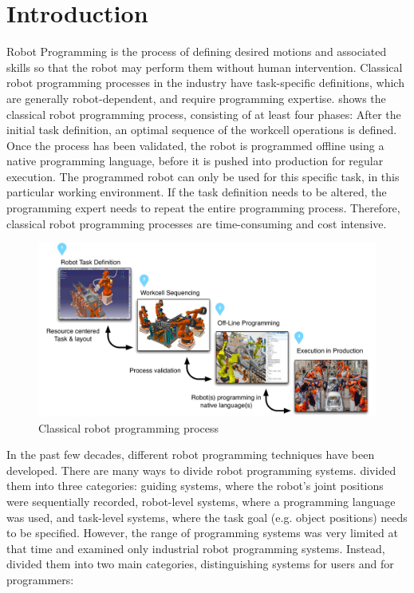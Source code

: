 \section{Introduction}
Robot Programming is the process of defining desired motions and associated skills so that the robot may perform them without human intervention.
Classical robot programming processes in the industry have task-specific definitions, which are generally robot-dependent, and require programming expertise.
 shows the classical robot programming process, consisting of at least four phases:
After the initial task definition, an optimal sequence of the workcell operations is defined.
Once the process has been validated, the robot is programmed offline using a native programming language, before it is pushed into production for regular execution.
The programmed robot can only be used for this specific task, in this particular working environment.
If the task definition needs to be altered, the programming expert needs to repeat the entire programming process.
Therefore, classical robot programming processes are time-consuming and cost intensive.

\begin{figure}[ht]
	\centering
	\includegraphics[width=\linewidth]{figures/manual-programming}
	\caption{Classical robot programming process}
	\label{fig:Classical robot programming process}
\end{figure}

In the past few decades, different robot programming techniques have been developed. 
There are many ways to divide robot programming systems. 
\cite{lozano1983robot} divided them into three categories: 
guiding systems, where the robot's joint positions were sequentially recorded,
robot-level systems, where a programming language was used, and
task-level systems, where the task goal (e.g. object positions) needs to be specified.
However, the range of programming systems was very limited at that time and examined only industrial robot programming systems.
Instead, \cite{Biggs2003} divided them into two main categories, distinguishing systems for users and for programmers:

